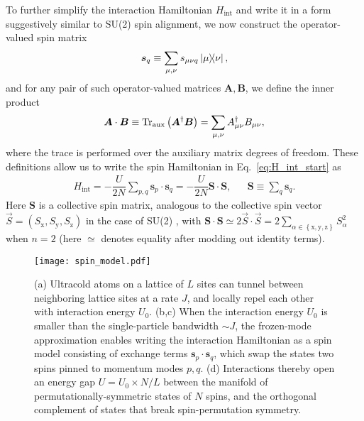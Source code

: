 \documentclass[nofootinbib,twocolumn]{revtex4-2}
\renewcommand{\t}{\text} %
\newcommand{\f}[2]{\dfrac{#1}{#2}} %
\newcommand{\p}[1]{\left(#1\right)} %
\renewcommand{\set}[1]{\left\{#1\right\}} %
\renewcommand{\v}{\bm} %
\renewcommand{\c}{\cdot} %
\newcommand{\1}{\mathds{1}}
\newcommand{\x}{\text{x}}
\newcommand{\y}{\text{y}}
\newcommand{\z}{\text{z}}
\begin{document}
To further simplify the interaction Hamiltonian $H_{\t{int}}$ and write it in a form suggestively similar to SU(2) spin alignment, we now construct the operator-valued spin matrix
\begin{align}
  \v s_q \equiv \sum_{\mu,\nu} s_{\mu\nu q} \op{\mu}{\nu},
\end{align}
and for any pair of such operator-valued matrices $\v A,\v B$, we define the inner product
\begin{align}
  \v A \c \v B \equiv \Tr_{\t{aux}}\p{\v A^\dag\v B}
  = \sum_{\mu,\nu} A_{\mu\nu}^\dag B_{\mu\nu},
\end{align}
where the trace is performed over the auxiliary matrix degrees of freedom.
These definitions allow us to write the spin Hamiltonian in Eq.~\eqref{eq:H_int_start} as
\begin{align}
  H_{\t{int}} = -\f{U}{2N} \sum_{p,q} \v s_p\c\v s_q
  = -\f{U}{2N}\v S\c\v S,
  &&
  \v S \equiv \sum_q \v s_q.
  \label{eq:H_int}
\end{align}
Here $\v S$ is a collective spin matrix, analogous to the collective spin vector $\vec S=\p{S_\x,S_\y,S_\z}$ in the case of SU(2) \cite{he2019engineering}, with $\v S\c\v S \simeq 2 \vec S\c\vec S = 2 \sum_{\alpha\in\set{\x,\y,\z}}S_\alpha^2$ when $n=2$ (here $\simeq$ denotes equality after modding out identity terms).

\begin{figure}
\centering
\texttt{[image: spin\_model.pdf]}
\caption{
(a) Ultracold atoms on a lattice of $L$ sites can tunnel between neighboring lattice sites at a rate $J$, and locally repel each other with interaction energy $U_0$.
(b,c) When the interaction energy $U_0$ is smaller than the single-particle bandwidth $\sim J$, the frozen-mode approximation enables writing the interaction Hamiltonian as a spin model consisting of exchange terms $\v s_p\c\v s_q$, which swap the states two spins pinned to momentum modes $p,q$.
(d) Interactions thereby open an energy gap $U=U_0\times N/L$ between the manifold of permutationally-symmetric states of $N$ spins, and the orthogonal complement of states that break spin-permutation symmetry.
}
\label{fig:spin_model}
\end{figure}
\end{document}
